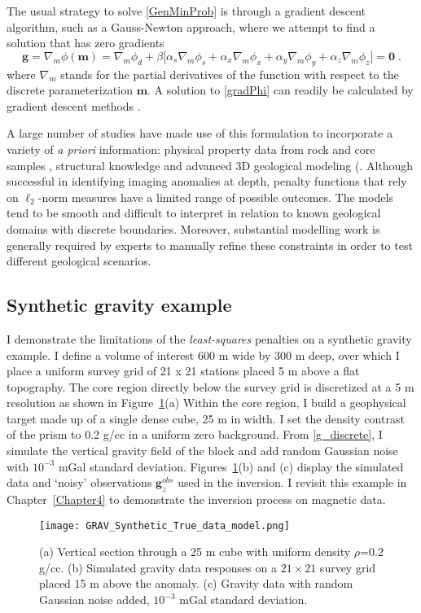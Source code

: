 The usual strategy to solve \eqref{GenMinProb} is through a gradient descent algorithm, such as a Gauss-Newton approach, where we attempt to find a solution that has zero gradients
\begin{equation}\label{gradPhi}
\mathbf{g} = \nabla_m \phi(\mathbf{m}) = \nabla_m \phi_d + \beta \bigg[ \alpha_s \nabla_m \phi_s + \alpha_x \nabla_m \phi_x + \alpha_y \nabla_m \phi_y + \alpha_z \nabla_m \phi_z \bigg] = \mathbf{0} \;.
\end{equation}
where $\nabla_m$ stands for the partial derivatives of the function with respect to the discrete parameterization $\mathbf{m}$.
A solution to \eqref{gradPhi} can readily be calculated by gradient descent methods \cite[]{HestenesStiefel1952, NocedalWright99}.

A large number of studies have made use of this formulation to incorporate a variety of \emph{a priori} information: physical property data from rock and core samples \cite[]{LelievreOldenburgWilliams09}, structural knowledge \cite[]{LiDWO2000, PhDLelievre09} and advanced 3D geological modeling (\cite[]{Phillips1996, Williams08, Bosh2001, Fullagar2008}.
Although successful in identifying imaging anomalies at depth, penalty functions that rely on $\ell_2$-norm measures have a limited range of possible outcomes. The models tend to be smooth and difficult to interpret in relation to known geological domains with discrete boundaries. Moreover, substantial modelling work is generally required by experts to manually refine these constraints in order to test different geological scenarios.

\subsection{Synthetic gravity example}
I demonstrate the limitations of the \emph{least-squares} penalties on a synthetic gravity example. I define a volume of interest 600 m wide by 300 m deep, over which I place a uniform survey grid of 21 x 21 stations placed 5 m above a flat topography.
The core region directly below the survey grid is discretized at a 5 m resolution as shown in Figure~\ref{GRAV_model}(a)
Within the core region, I build a geophysical target made up of a single dense cube, 25 m in width. I set the density contrast of the prism to 0.2 g/cc in a uniform zero background. From \eqref{g_discrete}, I simulate the vertical gravity field of the block and add random Gaussian noise with $10^{-3}$ mGal standard deviation. Figures~\ref{GRAV_model}(b) and (c) display the simulated data and `noisy' observations $\mathbf{g}_z^{obs}$ used in the inversion. I revisit this example in Chapter~\ref{Chapter4} to demonstrate the inversion process on magnetic data.
\begin{figure}[h!]
{\centering
\texttt{[image: GRAV\_Synthetic\_True\_data\_model.png]}}
\caption{(a) Vertical section through a 25 m cube with uniform density $\rho$=0.2 g/cc. (b) Simulated gravity data responses on a $21 \times 21$ survey grid placed 15 m above the anomaly. (c) Gravity data with random Gaussian noise added, $10^{-3}$ mGal standard deviation.}
\label{GRAV_model}
\end{figure}


